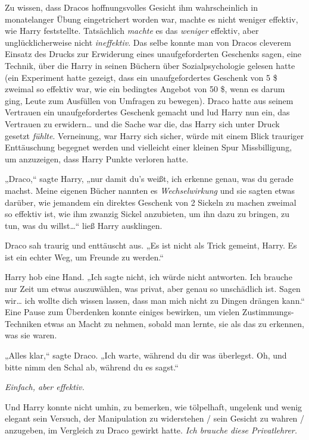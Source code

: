 {Zu wissen, dass Dracos hoffnungsvolles Gesicht ihm wahrscheinlich in monatelanger Übung eingetrichert worden war, machte es nicht weniger effektiv, wie Harry feststellte. Tatsächlich \emph{machte} es das \emph{weniger} effektiv, aber unglücklicherweise nicht \emph{ineffektiv}. Das selbe konnte man von Dracos cleverem Einsatz des Drucks zur Erwiderung eines unaufgeforderten Geschenks sagen, eine Technik, über die Harry in seinen Büchern über Sozialpsychologie gelesen hatte (ein Experiment hatte gezeigt, dass ein unaufgefordertes Geschenk von 5 \$ zweimal so effektiv war, wie ein bedingtes Angebot von 50 \$, wenn es darum ging, Leute zum Ausfüllen von Umfragen zu bewegen). Draco hatte aus seinem Vertrauen ein unaufgefordertes Geschenk gemacht und lud Harry nun ein, das Vertrauen zu erwidern… und die Sache war die, das Harry sich unter Druck gesetzt \emph{fühlte}. Verneinung, war Harry sich sicher, würde mit einem Blick trauriger Enttäuschung begegnet werden und vielleicht einer kleinen Spur Missbilligung, um anzuzeigen, dass Harry Punkte verloren hatte.

„Draco,“ sagte Harry, „nur damit du's weißt, ich erkenne genau, was du gerade machst. Meine eigenen Bücher nannten es \emph{Wechselwirkung} und sie sagten etwas darüber, wie jemandem ein direktes Geschenk von 2 Sickeln zu machen zweimal so effektiv ist, wie ihm zwanzig Sickel anzubieten, um ihn dazu zu bringen, zu tun, was du willst…“ ließ Harry ausklingen.

Draco sah traurig und enttäuscht aus. „Es ist nicht als Trick gemeint, Harry. Es ist ein echter Weg, um Freunde zu werden.“

Harry hob eine Hand. „Ich sagte nicht, ich würde nicht antworten. Ich brauche nur Zeit um etwas auszuwählen, was privat, aber genau so unschädlich ist. Sagen wir… ich wollte dich wissen lassen, dass man mich nicht zu Dingen drängen kann.“ Eine Pause zum Überdenken konnte einiges bewirken, um vielen Zustimmungs-Techniken etwas an Macht zu nehmen, sobald man lernte, sie als das zu erkennen, was sie waren.

„Alles klar,“ sagte Draco. „Ich warte, während du dir was überlegst. Oh, und bitte nimm den Schal ab, während du es sagst.“

\emph{Einfach, aber effektiv.}

Und Harry konnte nicht umhin, zu bemerken, wie tölpelhaft, ungelenk und wenig elegant sein Versuch, der Manipulation zu widerstehen / sein Gesicht zu wahren / anzugeben, im Vergleich zu Draco gewirkt hatte. \emph{Ich brauche diese Privatlehrer.}

}
